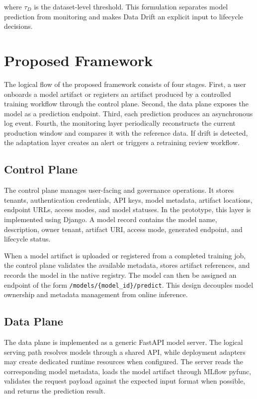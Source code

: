 \documentclass[runningheads]{llncs}
\begin{document}
where $\tau_D$ is the dataset-level threshold. This formulation separates model prediction from monitoring and makes Data Drift an explicit input to lifecycle decisions.

\section{Proposed Framework}

The logical flow of the proposed framework consists of four stages. First, a user onboards a model artifact or registers an artifact produced by a controlled training workflow through the control plane. Second, the data plane exposes the model as a prediction endpoint. Third, each prediction produces an asynchronous log event. Fourth, the monitoring layer periodically reconstructs the current production window and compares it with the reference data. If drift is detected, the adaptation layer creates an alert or triggers a retraining review workflow.


\subsection{Control Plane}

The control plane manages user-facing and governance operations. It stores tenants, authentication credentials, API keys, model metadata, artifact locations, endpoint URLs, access modes, and model statuses. In the prototype, this layer is implemented using Django. A model record contains the model name, description, owner tenant, artifact URI, access mode, generated endpoint, and lifecycle status.

When a model artifact is uploaded or registered from a completed training job, the control plane validates the available metadata, stores artifact references, and records the model in the native registry. The model can then be assigned an endpoint of the form \texttt{/models/\{model\_id\}/predict}. This design decouples model ownership and metadata management from online inference.

\subsection{Data Plane}

The data plane is implemented as a generic FastAPI model server. The logical serving path resolves models through a shared API, while deployment adapters may create dedicated runtime resources when configured. The server reads the corresponding model metadata, loads the model artifact through MLflow pyfunc, validates the request payload against the expected input format when possible, and returns the prediction result.
\end{document}
